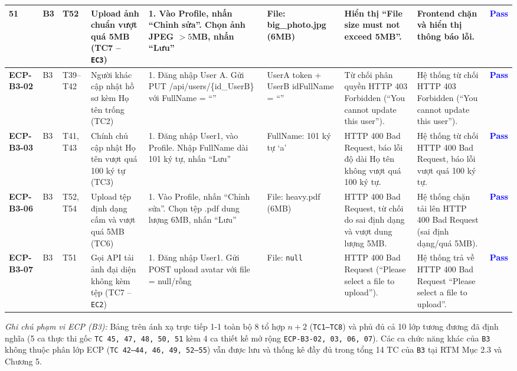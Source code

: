 \documentclass[11pt,a4paper]{article}
\begin{document}
\begin{longtable}{|C{0.85cm}|C{0.7cm}|C{0.95cm}|L{2.0cm}|L{3.0cm}|L{2.25cm}|L{2.6cm}|L{2.5cm}|C{0.85cm}|}
\textbf{51} & B3 & T52 & Upload ảnh chuẩn vượt quá 5MB (TC7 -- \texttt{EC3}) & 1. Vào Profile, nhấn ``Chỉnh sửa''. Chọn ảnh JPEG $> 5$MB, nhấn ``Lưu'' & File: big\_photo.jpg (6MB) & Hiển thị ``File size must not exceed 5MB''. & Frontend chặn và hiển thị thông báo lỗi. & \textcolor{blue}{\textbf{Pass}} \\ \hline
\textbf{ECP-B3-02} & B3 & T39--T42 & Người khác cập nhật hồ sơ kèm Họ tên trống (TC2) & 1. Đăng nhập User A. Gửi PUT /api/users/\{id\_UserB\} với FullName = ``'' & UserA token + UserB id\newline FullName = ``'' & Từ chối phân quyền HTTP 403 Forbidden (``You cannot update this user''). & Hệ thống từ chối HTTP 403 Forbidden (``You cannot update this user''). & \textcolor{blue}{\textbf{Pass}} \\ \hline
\textbf{ECP-B3-03} & B3 & T41, T43 & Chính chủ cập nhật Họ tên vượt quá 100 ký tự (TC3) & 1. Đăng nhập User1, vào Profile. Nhập FullName dài 101 ký tự, nhấn ``Lưu'' & FullName: 101 ký tự `a' & HTTP 400 Bad Request, báo lỗi độ dài Họ tên không vượt quá 100 ký tự. & Hệ thống từ chối HTTP 400 Bad Request, báo lỗi vượt quá 100 ký tự. & \textcolor{blue}{\textbf{Pass}} \\ \hline
\textbf{ECP-B3-06} & B3 & T52, T54 & Upload tệp định dạng cấm và vượt quá 5MB (TC6) & 1. Vào Profile, nhấn ``Chỉnh sửa''. Chọn tệp .pdf dung lượng 6MB, nhấn ``Lưu'' & File: heavy.pdf (6MB) & HTTP 400 Bad Request, từ chối do sai định dạng và vượt dung lượng 5MB. & Hệ thống chặn tải lên HTTP 400 Bad Request (sai định dạng/quá 5MB). & \textcolor{blue}{\textbf{Pass}} \\ \hline
\textbf{ECP-B3-07} & B3 & T51 & Gọi API tải ảnh đại diện không kèm tệp (TC7 -- \texttt{EC2}) & 1. Đăng nhập User1. Gửi POST upload avatar với file = null/rỗng & File: \texttt{null} & HTTP 400 Bad Request (``Please select a file to upload''). & Hệ thống trả về HTTP 400 Bad Request ``Please select a file to upload''. & \textcolor{blue}{\textbf{Pass}} \\ \hline
\end{longtable}
\endgroup

\noindent\textit{Ghi chú phạm vi ECP (B3):} Bảng trên ánh xạ trực tiếp 1-1 toàn bộ 8 tổ hợp $n+2$ (\texttt{TC1--TC8}) và phủ đủ cả 10 lớp tương đương đã định nghĩa (5 ca thực thi gốc \texttt{TC 45, 47, 48, 50, 51} kèm 4 ca thiết kế mở rộng \texttt{ECP-B3-02, 03, 06, 07}). Các ca chức năng khác của \texttt{B3} không thuộc phân lớp ECP (\texttt{TC 42--44, 46, 49, 52--55}) vẫn được lưu và thống kê đầy đủ trong tổng 14 TC của \texttt{B3} tại RTM Mục 2.3 và Chương 5.
\end{document}
